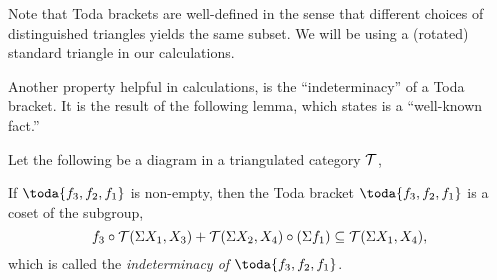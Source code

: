 Note that Toda brackets are well-defined in the sense that different choices of distinguished triangles yields the same subset. We will be using a (rotated) standard triangle in our calculations.

Another property helpful in calculations, is the ``indeterminacy'' of a Toda bracket. It is the result of the following lemma, which \cite{Christensen-Frankland_2017} states is a ``well-known fact.''
\begin{lemma}
    \label{lem:indeterminacy}
    Let the following be a diagram in a triangulated category \( {\mathcal{T}} \),
    \begin{center}
    \end{center}

    If \( \toda{f_3, f_2, f_1} \) is non-empty, then the Toda bracket \( \toda{f_3, f_2, f_1} \) is a coset of the subgroup,
    \[
        f_3 \circ {\mathcal{T}}(\Sigma X_1, X_3)  + {\mathcal{T}}(\Sigma X_2, X_4) \circ (\Sigma f_1) \subseteq {\mathcal{T}}(\Sigma X_1, X_4),
    \]
    which is called the \emph{indeterminacy of \( \toda{f_3, f_2, f_1} \)}.
\end{lemma}